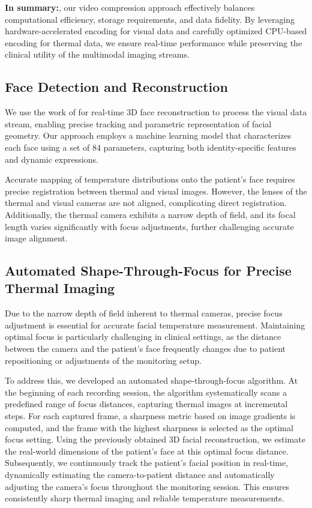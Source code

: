 \vspace{1ex}
\noindent \textbf{In summary:}, our video compression approach effectively balances computational efficiency, storage requirements, and data fidelity. By leveraging hardware-accelerated encoding for visual data and carefully optimized CPU-based encoding for thermal data, we ensure real-time performance while preserving the clinical utility of the multimodal imaging streams.

\subsection{Face Detection and Reconstruction}
We use the work of \cite{guo2020towards} for real-time 3D face reconstruction to process the visual data stream, enabling precise tracking and parametric representation of facial geometry. Our approach employs a machine learning model that characterizes each face using a set of 84 parameters, capturing both identity-specific features and dynamic expressions.

Accurate mapping of temperature distributions onto the patient's face requires precise registration between thermal and visual images. However, the lenses of the thermal and visual cameras are not aligned, complicating direct registration. Additionally, the thermal camera exhibits a narrow depth of field, and its focal length varies significantly with focus adjustments, further challenging accurate image alignment.

\subsection{Automated Shape-Through-Focus for Precise Thermal Imaging}
\label{sec:shape-through-focus}

Due to the narrow depth of field inherent to thermal cameras, precise focus adjustment is essential for accurate facial temperature measurement. Maintaining optimal focus is particularly challenging in clinical settings, as the distance between the camera and the patient's face frequently changes due to patient repositioning or adjustments of the monitoring setup.

To address this, we developed an automated shape-through-focus algorithm. At the beginning of each recording session, the algorithm systematically scans a predefined range of focus distances, capturing thermal images at incremental steps. For each captured frame, a sharpness metric based on image gradients is computed, and the frame with the highest sharpness is selected as the optimal focus setting. Using the previously obtained 3D facial reconstruction, we estimate the real-world dimensions of the patient's face at this optimal focus distance. Subsequently, we continuously track the patient's facial position in real-time, dynamically estimating the camera-to-patient distance and automatically adjusting the camera's focus throughout the monitoring session. This ensures consistently sharp thermal imaging and reliable temperature measurements.

